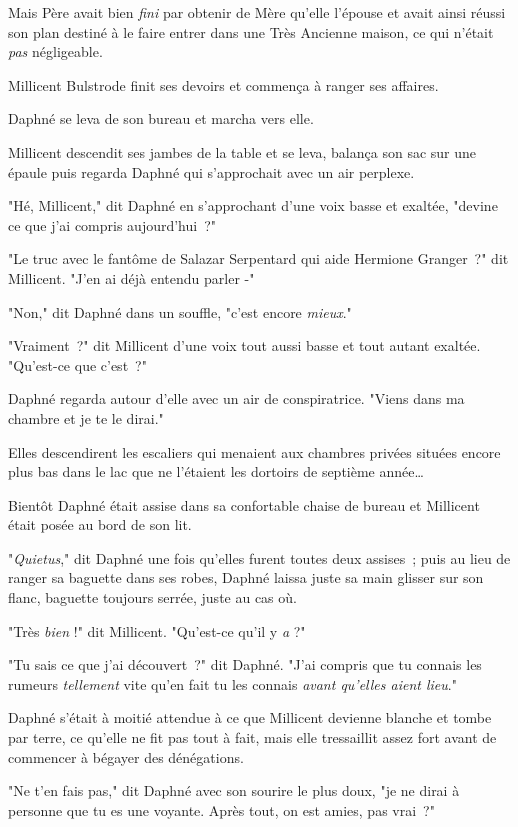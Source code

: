 Mais Père avait bien \emph{fini} par obtenir de Mère qu'elle l'épouse et avait ainsi réussi son plan destiné à le faire entrer dans une Très Ancienne maison, ce qui n'était \emph{pas} négligeable.

Millicent Bulstrode finit ses devoirs et commença à ranger ses affaires.

Daphné se leva de son bureau et marcha vers elle.

Millicent descendit ses jambes de la table et se leva, balança son sac sur une épaule puis regarda Daphné qui s'approchait avec un air perplexe.

"Hé, Millicent," dit Daphné en s'approchant d'une voix basse et exaltée, "devine ce que j'ai compris aujourd'hui~?"

"Le truc avec le fantôme de Salazar Serpentard qui aide Hermione Granger~?" dit Millicent. "J'en ai déjà entendu parler -"

"Non," dit Daphné dans un souffle, "c'est encore \emph{mieux}."

"Vraiment~?" dit Millicent d'une voix tout aussi basse et tout autant exaltée. "Qu'est-ce que c'est~?"

Daphné regarda autour d'elle avec un air de conspiratrice. "Viens dans ma chambre et je te le dirai."

Elles descendirent les escaliers qui menaient aux chambres privées situées encore plus bas dans le lac que ne l'étaient les dortoirs de septième année…

Bientôt Daphné était assise dans sa confortable chaise de bureau et Millicent était posée au bord de son lit.

"\emph{Quietus}," dit Daphné une fois qu'elles furent toutes deux assises~; puis au lieu de ranger sa baguette dans ses robes, Daphné laissa juste sa main glisser sur son flanc, baguette toujours serrée, juste au cas où.

"Très \emph{bien} !" dit Millicent. "Qu'est-ce qu'il y \emph{a} ?"

"Tu sais ce que j'ai découvert~?" dit Daphné. "J'ai compris que tu connais les rumeurs \emph{tellement} vite qu'en fait tu les connais \emph{avant qu'elles aient lieu}."

Daphné s'était à moitié attendue à ce que Millicent devienne blanche et tombe par terre, ce qu'elle ne fit pas tout à fait, mais elle tressaillit assez fort avant de commencer à bégayer des dénégations.

"Ne t'en fais pas," dit Daphné avec son sourire le plus doux, "je ne dirai à personne que tu es une voyante. Après tout, on est amies, pas vrai~?"

